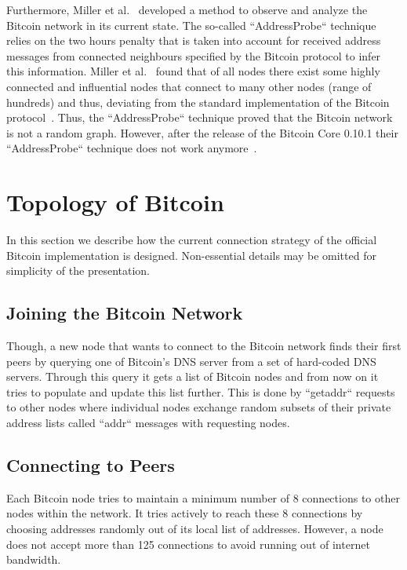 \documentclass[a4paper, oneside]{discothesis}
\begin{document}
Furthermore, Miller et al.~\cite{DiscoveringBitcoinsPublicTopologyAndInfluentialNodes} developed a method to observe and analyze the Bitcoin network in its current state. The so-called ``AddressProbe`` technique relies on the two hours penalty that is taken into account for received address messages from connected neighbours specified by the Bitcoin protocol to infer this information. Miller et al.~\cite{DiscoveringBitcoinsPublicTopologyAndInfluentialNodes} found that of all nodes there exist some highly connected and influential nodes that connect to many other nodes (range of hundreds) and thus, deviating from the standard implementation of the Bitcoin protocol~\cite{GithubBitcoin}. Thus, the ``AddressProbe`` technique proved that the Bitcoin network is not a random graph. However, after the release of the Bitcoin Core 0.10.1 their ``AddressProbe`` technique does not work anymore~\cite{BlockchainInnefficiency}.

\section{Topology of Bitcoin}
In this section we describe how the current connection strategy of the official Bitcoin implementation is designed. Non-essential details may be omitted for simplicity of the presentation.

\subsection{Joining the Bitcoin Network}
Though, a new node that wants to connect to the Bitcoin network finds their first peers by querying one of Bitcoin's DNS server from a set of hard-coded DNS servers. Through this query it gets a list of Bitcoin nodes and from now on it tries to populate and update this list further. This is done by ``getaddr`` requests~\cite{protocolDocumentation} to other nodes where individual nodes exchange random subsets of their private address lists called ``addr`` messages with requesting nodes.

\subsection{Connecting to Peers}
Each Bitcoin node tries to maintain a minimum number of 8 connections to other nodes within the network. It tries actively to reach these 8 connections by choosing addresses randomly out of its local list of addresses.
However, a node does not accept more than 125 connections to avoid running out of internet bandwidth.
\end{document}
